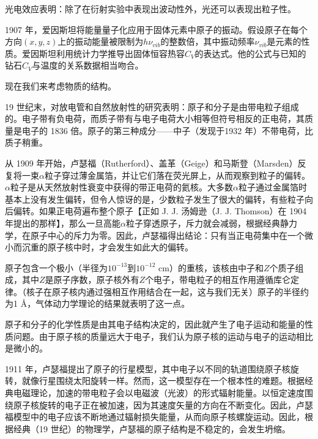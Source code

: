 	光电效应表明：除了在衍射实验中表现出波动性外，光还可以表现出粒子性。

	1907 年，爱因斯坦将能量量子化应用于固体元素中原子的振动。假设原子在每个方向$\left(x,y,z\right)$上的振动能量被限制为$h\nu_{vib}$的整数倍，其中振动频率$\nu_{vib}$是元素的性质。爱因斯坦利用统计力学推导出固体恒容热容$C_V$的表达式。他的公式与已知的钻石$C_V$与温度的关系数据相当吻合。

	现在我们来考虑物质的结构。

	19 世纪末，对放电管和自然放射性的研究表明：原子和分子是由带电粒子组成的。电子带有负电荷，而质子带有与电子电荷大小相等但符号相反的正电荷，其质量是电子的 1836 倍。原子的第三种成分——中子（发现于1932 年）不带电荷，比质子稍重。

	从 1909 年开始，卢瑟福（Rutherford）、盖革（Geige）和马斯登（Marsden）反复将一束$\alpha$粒子穿过薄金属箔，并让它们落在荧光屏上，从而观察到粒子的偏转。$\alpha$粒子是从天然放射性衰变中获得的带正电荷的氦核。大多数$\alpha$粒子通过金属箔时基本上没有发生偏转，但令人惊讶的是，少数粒子发生了很大的偏转，有些粒子向后偏转。如果正电荷遍布整个原子【正如 J. J. 汤姆逊（J. J. Thomson）在 1904 年提出的那样】，那么一旦高能$\alpha$粒子穿透原子，斥力就会减弱，根据经典静力学，在原子中心的斥力为零。因此，卢瑟福得出结论：只有当正电荷集中在一个微小而沉重的原子核中时，才会发生如此大的偏转。

	原子包含一个极小（半径为$10^{-13}$到$10^{-12}$ cm）的重核，该核由中子和$Z$个质子组成，其中$Z$是原子序数，原子核外有$Z$个电子，带电粒子的相互作用遵循库仑定律。（核子在原子核内通过强相互作用结合在一起，这与我们无关）原子的半径约为1 \AA，气体动力学理论的结果就表明了这一点。

	原子和分子的化学性质是由其电子结构决定的，因此就产生了电子运动和能量的性质问题。由于原子核的质量远大于电子，我们认为原子核的运动与电子的运动相比是微小的。

	1911 年，卢瑟福提出了原子的行星模型，其中电子以不同的轨道围绕原子核旋转，就像行星围绕太阳旋转一样。然而，这一模型存在一个根本性的难题。根据经典电磁理论，加速的带电粒子会以电磁波（光波）的形式辐射能量。以恒定速度围绕原子核旋转的电子正在被加速，因为其速度矢量的方向在不断变化。因此，卢瑟福模型中的电子应该不断地通过辐射损失能量，从而向原子核螺旋运动。因此，根据经典（19 世纪）的物理学，卢瑟福的原子结构是不稳定的，会发生坍缩。

